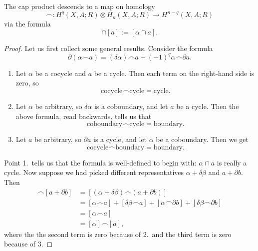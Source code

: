 \documentclass[main.tex]{subfiles}
\begin{document}
\begin{proposition}
  The cap product descends to a map on homology
  \begin{equation*}
    \frown\colon H^{q}(X, A; R) \otimes H_{n}(X, A; R) \to H^{n-q}(X, A; R)
  \end{equation*}
  via the formula
  \begin{equation*}
    [\alpha] \cap [a] := [\alpha \cap a].
  \end{equation*}
\end{proposition}
\begin{proof}
  Let us first collect some general results. Consider the formula
  \begin{equation*}
    \partial(\alpha \frown a) = (\delta \alpha) \frown a + (-1)^{q} \alpha \frown \partial a.
  \end{equation*}
  \begin{enumerate}
    \item Let \(\alpha\) be a cocycle and \(a\) be a cycle. Then each term on the right-hand side is zero, so
      \begin{equation*}
        \text{cocycle} \frown \text{cycle} = \text{cycle}.
      \end{equation*}

    \item Let \(\alpha\) be arbitrary, so \(\delta \alpha\) is a coboundary, and let \(a\) be a cycle. Then the above formula, read backwards, tells us that
      \begin{equation*}
        \text{coboundary} \frown \text{cycle} = \text{boundary}.
      \end{equation*}

    \item Let \(a\) be arbitrary, so \(\partial a\) is a cycle, and let \(\alpha\) be a coboundary. Then we get
      \begin{equation*}
        \text{cocycle} \frown \text{boundary} = \text{boundary}.
      \end{equation*}
  \end{enumerate}

  Point 1.\ tells us that the formula is well-defined to begin with: \(\alpha \cap a\) is really a cycle. Now suppose we had picked different representatives \(\alpha + \delta \beta\) and \(a + \partial b\). Then
  \begin{align*}
    [\alpha + \delta \beta] \frown [a + \partial b] &= [(\alpha + \delta \beta) \frown (a + \partial b)] \\
    &= [\alpha \frown a] + [\delta \beta \frown a] + [\alpha \frown \partial b] + [\delta \beta \frown \partial b] \\
    &= [\alpha \frown a] \\
    &= [\alpha] \frown [a],
  \end{align*}
  where the the second term is zero because of 2.\ and the third term is zero because of 3.
\end{proof}
\end{document}
